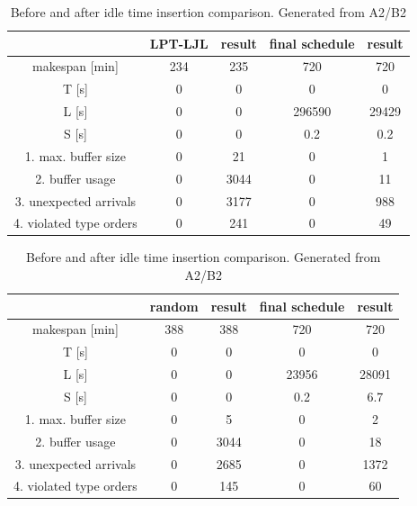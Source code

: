 \documentclass{ctuthesis}
\begin{document}
\begin{table}[H]
\begin{tabular}{ |c|| c | c | c | c |} 
\hline
 & LPT-LJL & result & final schedule & result \\ 
\hline
makespan [min] & 234 & 235 & 720 & 720 \\
\hline
T [s]& 0 & 0 & 0 & 0 \\
\hline
L [s]& 0 & 0 & 296590 & 29429 \\
\hline
S [s]& 0 & 0 & 0.2 & 0.2 \\
\hline
1. max. buffer size & 0 & 21 & 0 & 1\\ 
\hline
2. buffer usage  & 0 & 3044 & 0 & 11\\ 
\hline
3. unexpected arrivals & 0 & 3177 & 0 & 988\\ 
\hline
4. violated type orders & 0 & 241 & 0 & 49\\ 
\hline
\end{tabular}
\caption{Before and after idle time insertion comparison. Generated from A2/B2}
\end{table}

\begin{table}[H]
\begin{tabular}{ |c|| c | c | c | c |} 
\hline
 & random & result & final schedule & result \\ 
\hline
makespan [min] & 388 & 388 & 720 & 720 \\
\hline
T [s]& 0 & 0 & 0 & 0 \\
\hline
L [s]& 0 & 0 & 23956 &  28091 \\
\hline
S [s]& 0 & 0 & 0.2 & 6.7\\
\hline
1. max. buffer size & 0 & 5 & 0 & 2\\ 
\hline
2. buffer usage  & 0 & 3044 & 0 & 18\\ 
\hline
3. unexpected arrivals & 0 & 2685 & 0 & 1372\\ 
\hline
4. violated type orders & 0 & 145 & 0 & 60\\ 
\hline
\end{tabular}
\caption{Before and after idle time insertion comparison. Generated from A2/B2}
\end{table}
\end{document}
